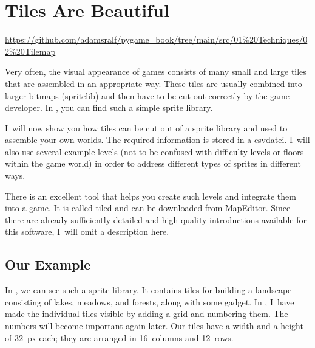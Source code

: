 \newpage
\section{Tiles Are Beautiful}
\begin{diskbox}
	\url{https://github.com/adamsralf/pygame_book/tree/main/src/01%20Techniques/02%20Tilemap}
\end{diskbox}
Very often, the visual appearance of games consists of many small and large tiles that are assembled in an appropriate way. These tiles are usually combined into larger bitmaps (\gls{spritelib}) and then have to be cut out correctly by the game developer. In , you can find such a simple sprite library.

I~will now show you how tiles can be cut out of a sprite library and used to assemble your own worlds. The required information is stored in a \Gls{csvdatei}. I~will also use several example levels (not to be confused with difficulty levels or floors within the game world) in order to address different types of sprites in different ways.

\begin{hintbox}[Hint]
	There is an excellent tool that helps you create such levels and integrate them into a game. It is called \Gls{tiled} and can be downloaded from \hyperlink{https://www.mapeditor.org/}{MapEditor}. Since there are already sufficiently detailed and high-quality introductions available for this software, I~will omit a description here.
	
\end{hintbox}

\subsection{Our Example}


In , we can see such a sprite library. It contains tiles for building a landscape consisting of lakes, meadows, and forests, along with some \gls{gadget}. In , I~have made the individual tiles visible by adding a grid and numbering them. The numbers will become important again later. Our tiles have a width and a height of \SI{32}{px} each; they are arranged in \SI{16}{columns} and \SI{12}{rows}.

